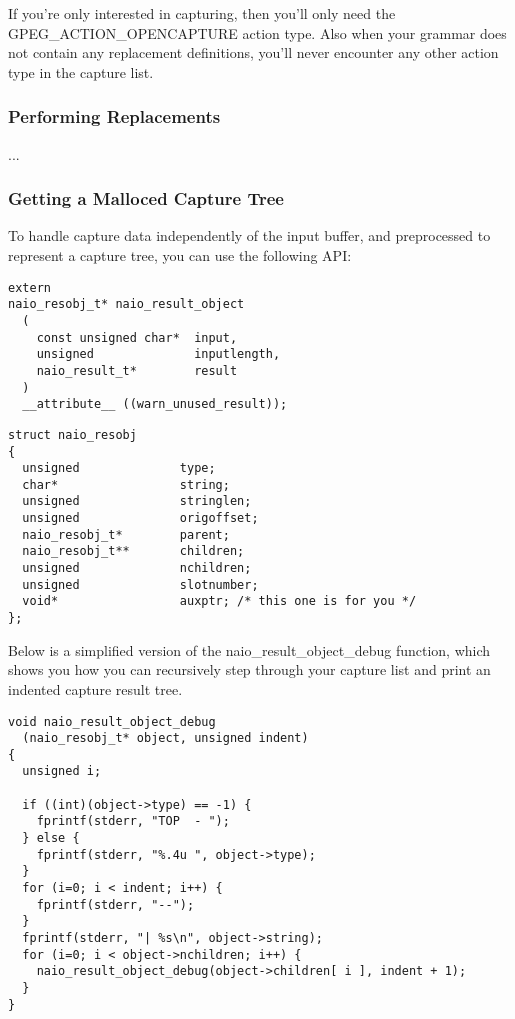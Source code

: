 If you're only interested in capturing, then you'll only
need the GPEG\_ACTION\_OPENCAPTURE action type. Also when
your grammar does not contain any replacement definitions, you'll never
encounter any other action type in the capture list.

\subsubsection{Performing Replacements}

...

\subsubsection{Getting a Malloced Capture Tree}

To handle capture data independently of the input buffer, and
preprocessed to represent a capture tree, you can use the following API:

\begin{myquote}
\begin{verbatim}
extern
naio_resobj_t* naio_result_object
  (
    const unsigned char*  input,
    unsigned              inputlength,
    naio_result_t*        result
  )
  __attribute__ ((warn_unused_result));
\end{verbatim}
\end{myquote}

\begin{myquote}
\begin{verbatim}
struct naio_resobj
{
  unsigned              type;
  char*                 string;
  unsigned              stringlen;
  unsigned              origoffset;
  naio_resobj_t*        parent;
  naio_resobj_t**       children;
  unsigned              nchildren;
  unsigned              slotnumber;
  void*                 auxptr; /* this one is for you */
};
\end{verbatim}
\end{myquote}

Below is a simplified version of the naio\_result\_object\_debug function,
which shows you how you can recursively step through your capture
list and print an indented capture result tree.

\begin{myquote}
\begin{verbatim}
void naio_result_object_debug
  (naio_resobj_t* object, unsigned indent)
{
  unsigned i;

  if ((int)(object->type) == -1) {
    fprintf(stderr, "TOP  - ");
  } else {
    fprintf(stderr, "%.4u ", object->type);
  }
  for (i=0; i < indent; i++) {
    fprintf(stderr, "--");
  }
  fprintf(stderr, "| %s\n", object->string);
  for (i=0; i < object->nchildren; i++) {
    naio_result_object_debug(object->children[ i ], indent + 1);
  }
}
\end{verbatim}
\end{myquote}

